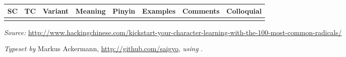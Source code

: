 \documentclass[fontsize=12pt,
			 parskip=full,
			 a4paper,
			 landscape,
			 pagesize,
			 DIV=12]{scrreprt}
\begin{document}
\begin{longtable}{|>{\large}c|>{\large}c|>{\large}c|p{3cm}|p{1.5cm}|>{\large}l|p{7cm}|p{2.5cm}|}
\hline
\normalsize\bfseries SC & \normalsize\bfseries TC & \normalsize\bfseries Variant & \bfseries Meaning & \bfseries Pinyin & \normalsize\bfseries Examples & \bfseries Comments & \bfseries Colloquial \\ \hline
\endhead
\hline
\endfoot

\end{longtable}
{\em Source:} \url{http://www.hackingchinese.com/kickstart-your-character-learning-with-the-100-most-common-radicals/}

{\em Typeset by} Markus Ackermann, \url{http://github.com/saigyo}, {\em using} \XeLaTeX.
\end{document}
